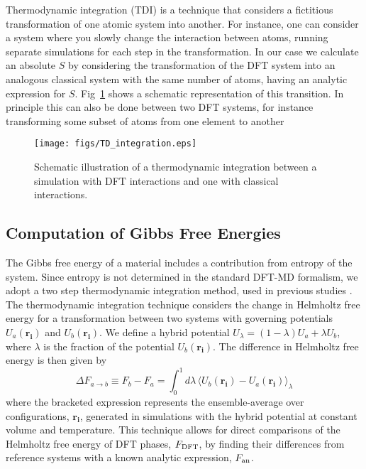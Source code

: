 Thermodynamic integration (TDI) is a technique that considers a fictitious
transformation of one atomic system into another. For instance, one can consider a
system where you slowly change the interaction between atoms, running separate
simulations for each step in the transformation. In our case we calculate an absolute
$S$ by considering the transformation of the DFT system into an
analogous classical system with the same number of atoms, having an analytic
expression for $S$. Fig~\ref{tdi} shows a schematic representation of this
transition. In principle this can also be done between two DFT systems, for
instance transforming some subset of atoms from one element to another 

 \begin{figure}[h!] %
   \centering
   \texttt{[image: figs/TD\_integration.eps]} 
\caption{Schematic illustration of a thermodynamic integration between a simulation 
    with DFT interactions and one with classical interactions. \label{tdi}}
\end{figure}

\subsection{Computation of Gibbs Free Energies}


The Gibbs free energy of a material includes a contribution from entropy of the system.
Since entropy is not determined in the standard DFT-MD formalism, we adopt a two step
thermodynamic integration method, used in previous studies
\citep{Wilson2010,Wilson2012a,Wahl2013,Gonzalez2014}.  The thermodynamic integration technique
considers the change in Helmholtz free energy for a transformation between two systems
with governing potentials $U_a\left(\mathbf{r_i}\right)$ and
$U_b\left(\mathbf{r_i}\right)$. We define a hybrid potential
$U_{\lambda}=\left(1-\lambda\right)U_a+\lambda U_b$, where $\lambda$ is the fraction of
the potential $U_b\left(\mathbf{r_i}\right)$. The difference in Helmholtz free energy is
then given by
\begin{equation} \label{eqn:td_int}
  \Delta F_{a\to b}\equiv F_b - F_a = \int_{0}^{1}{d\lambda\,\langle U_b\left(\mathbf{r_i}\right) -
  U_a\left(\mathbf{r_i}\right) \rangle_{\lambda}}
\end{equation}
where the bracketed expression represents the ensemble-average over configurations,
$\mathbf{r_i}$, generated in simulations with the hybrid potential at constant volume and
temperature. This technique allows for direct comparisons of the Helmholtz free energy of
DFT phases, $F_{\rm DFT}$, by finding their differences from reference systems with a known
analytic expression, $F_{\rm an}$. 

